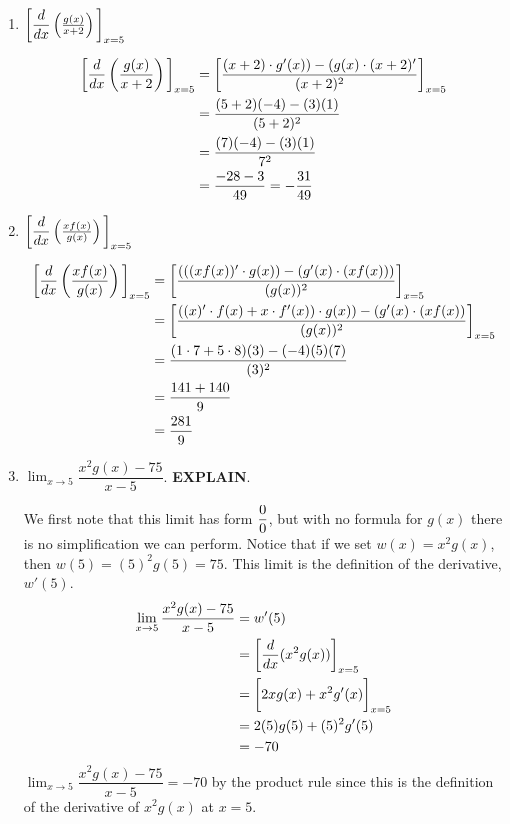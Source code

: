 \documentclass{ximera}
\begin{document}
\begin{problem}
\begin{enumerate}
	\item  $\bigg[  \dfrac{d}{dx} \left( \frac{g(x)}{x+2} \right) \bigg]_{x=5}$
\begin{explanation}
		\begin{align*}
		\bigg[ \dfrac{d}{dx} \left( \frac{g(x)}{x+2} \right) \bigg]_{x=5} &= \bigg[ \frac{(x+2) \cdot g'(x)) - (g(x) \cdot (x+2)'}{(x+2)^2} \bigg]_{x=5}  \\
		&= \frac{(5+2)(-4) - (3)(1)}{(5+2)^2}  \\
		&= \frac{(7)(-4) - (3)(1)}{7^2}  \\
		&= \frac{-28 - 3}{49} = - \frac{31}{49}
		\end{align*}
		\end{explanation}



	\item $\bigg[  \dfrac{d}{dx} \left( \frac{xf(x)}{g(x)} \right) \bigg]_{x=5}$
\begin{explanation}
		\begin{align*}
		\bigg[ \dfrac{d}{dx} \left( \frac{xf(x)}{g(x)} \right) \bigg]_{x=5} &= \bigg[ \frac{(((xf(x))' \cdot g(x)) - (g'(x) \cdot (xf(x)))}{(g(x))^2} \bigg]_{x=5}  \\
		&= \bigg[ \frac{\left( (x)' \cdot f(x)+x \cdot f'(x) \right) \cdot g(x)) - (g'(x) \cdot (xf(x))}{(g(x))^2} \bigg]_{x=5}  \\
		&= \frac{(1 \cdot 7+ 5 \cdot 8)(3) - (-4)(5)(7)}{(3)^2}  \\
		&= \frac{141+140}{9}  \\
		&= \frac{281}{9}
		\end{align*}
		\end{explanation}

	\item $\displaystyle \lim_{x\to 5} \dfrac{x^2 g(x) - 75 }{x-5}$. \textbf{EXPLAIN}.
\begin{explanation}
		
		We first note that this limit has form $\dfrac{0}{0}$, but with no formula for $g(x)$ there is no simplification we can perform.
		Notice that if we set $w(x) = x^2 g(x)$, then $w(5) = (5)^2 g(5) = 75$. This limit is the definition of the derivative, $w'(5)$.
		\begin{align*}
			\lim_{x\to 5} \dfrac{x^2 g(x) - 75 }{x-5} &= w'(5) \\
				&= \bigg[ \dfrac{d}{dx}( x^2 g(x) ) \bigg]_{x=5}\\
				&= \bigg[ 2x g(x) + x^2 g'(x)  \bigg]_{x=5}\\
				&= 2(5) g(5) + (5)^2 g'(5)\\
				&= -70
		\end{align*}
	$\displaystyle \lim_{x\to 5} \dfrac{x^2 g(x) - 75 }{x-5} = -70$ by the product rule since this is the definition of the derivative of $x^2 g(x)$ at $x=5$.	
		\end{explanation}
		

\end{enumerate}
\end{problem}
\end{document}
